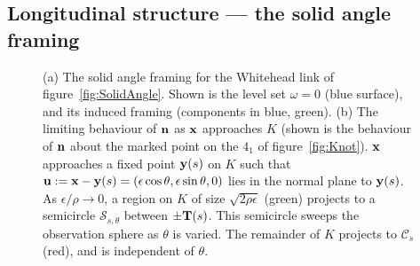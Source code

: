     \subsection{Longitudinal structure --- the solid angle framing}
    \begin{figure}[t]
        \caption[The solid angle framing.]{(a) The solid angle framing for the Whitehead link of figure~\ref{fig:SolidAngle}. Shown is the level set $\omega =0$ (blue surface), and its induced framing (components in blue, green). (b) The limiting behaviour of $\bf n$ as $\bf x$ approaches $K$ (shown is the behaviour of $\bf n$ about the marked point on the $4_1$ of figure~\ref{fig:Knot}). $\bf x$ approaches a fixed point ${\bf y}(s)$ on $K$ such that ${\bf u} := {\bf x} - {\bf y}(s) = (\epsilon \cos\theta, \epsilon \sin\theta,0)$ lies in the normal plane to ${\bf y} (s)$. As $\epsilon/\rho \rightarrow 0$, a region on $K$ of size $\sqrt{ 2 \rho \epsilon}$ (green) projects to a semicircle $\mathcal{S}_{s,\theta}$ between $\pm{\bf T}(s)$. This semicircle sweeps the observation sphere as $\theta$ is varied. The remainder of $K$ projects to $\mathcal{C}_s$ (red), and is independent of $\theta$.} 
        \label{fig:LocalStructure}
    \end{figure}

